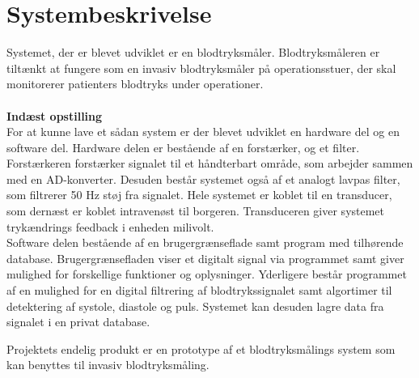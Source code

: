 \chapter{Systembeskrivelse}
Systemet, der er blevet udviklet er en blodtryksmåler. Blodtryksmåleren er tiltænkt at fungere som en invasiv blodtryksmåler på operationsstuer, der skal monitorerer patienters blodtryks under operationer.\\
\\ \textbf{Indæst opstilling}
\\
For at kunne lave et sådan system er der blevet udviklet en hardware del og en software del. 
Hardware delen er bestående af en forstærker, og et filter. Forstærkeren forstærker signalet til et håndterbart område, som arbejder sammen med en AD-konverter. Desuden består systemet også af et analogt lavpas filter, som filtrerer 50 Hz støj fra signalet. Hele systemet er koblet til en transducer, som dernæst er koblet intravenøst til borgeren. Transduceren giver systemet trykændrings feedback i enheden milivolt.  \\ [1ex]

Software delen bestående af en brugergrænseflade samt program med tilhørende database. Brugergrænsefladen viser et digitalt signal via programmet samt giver mulighed for forskellige funktioner og oplysninger. Yderligere består programmet af en mulighed for en digital filtrering af blodtrykssignalet samt algortimer til detektering af systole, diastole og puls. Systemet kan desuden lagre data fra signalet i en privat database.    

Projektets endelig produkt er en prototype af et blodtryksmålings system som kan benyttes til invasiv blodtryksmåling. 


